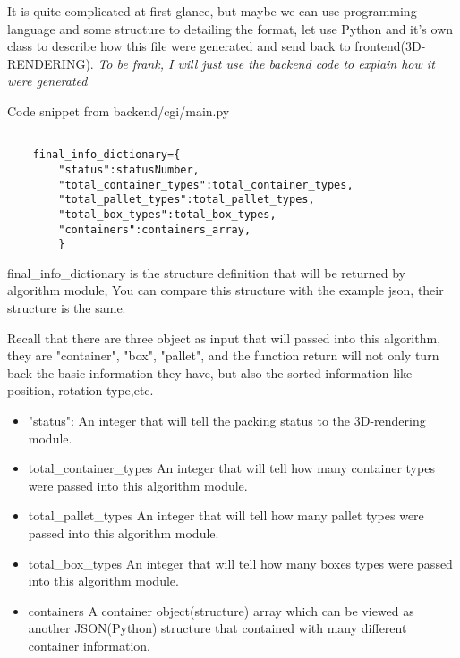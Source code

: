 \documentclass{article}
\begin{document}
It is quite complicated at first glance,
but maybe we can use programming language and some structure to detailing the format,
let use Python and it's own class to describe how this file were generated and send back to frontend(3D-RENDERING).
\newline
\textit{To be frank, I will just use the backend code to explain how it were generated}
\newline
\newpage
\caption{Code snippet from backend/cgi/main.py}
\begin{mdframed}[backgroundcolor=bg]
\begin{verbatim}

    final_info_dictionary={
        "status":statusNumber,
        "total_container_types":total_container_types,
        "total_pallet_types":total_pallet_types,
        "total_box_types":total_box_types,
        "containers":containers_array,
        }
\end{verbatim}
\end{mdframed}
final\_info\_dictionary is the structure definition that will be returned by algorithm module, You can compare this structure with the example json, their structure is the same. 

Recall that there are three object as input that will passed into this algorithm, they are "container", "box", "pallet", and
the function return will not only turn back the basic information they have, but also the sorted information like position, rotation type,etc.

\begin{itemize}
\item "status":
\newline 
An integer that will tell the packing status to the 3D-rendering module.
\item {total\_container\_types}
\newline 
An integer that will tell how many container types were passed into this algorithm module.
\item {total\_pallet\_types}
\newline
An integer that will tell how many pallet types were passed into this algorithm module.
\item {total\_box\_types}
\newline
An integer that will tell how many boxes types were passed into this algorithm module.
\item  {containers}
\newline
A container object(structure) array which can be viewed as another JSON(Python) structure that contained with many different container information.
\end{itemize}
\end{document}

